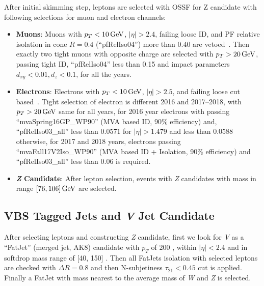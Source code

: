 After initial skimming step, leptons are selected with \gls{OSSF} for Z candidate
with following selections for muon and electron channels:
\begin{itemize}
  \item \textbf{Muons}: Muons with \( p_T < 10 \,\text{Ge\hspace{-.08em}V}{} \), \( |\eta| > 2.4 \),
        failing loose ID, and \gls{PF} relative isolation in cone \( R = 0.4 \) (``pfRelIso04'') more than
        \( 0.40 \) are vetoed~\cite{cms-muon-id}.
        Then exactly two tight muons with opposite charge are selected with \( p_T > 20 \,\text{Ge\hspace{-.08em}V}{} \), passing
        tight ID, ``pfRelIso04'' less than 0.15 and impact parameters \( d_{xy} < 0.01, d_z < 0.1 \),
        for all the years.
  \item \textbf{Electrons}: Electrons with \( p_T < 10 \,\text{Ge\hspace{-.08em}V}{} \), \( |\eta| > 2.5 \),
        and failing loose cut based~\cite{cms-egamma-id}.
        Tight selection of electron is different 2016 and 2017--2018,
        with \( p_T > 20 \,\text{Ge\hspace{-.08em}V} \) same for all years, for 2016 year electrons with
        passing ``mvaSpring16GP\_WP90'' (MVA based ID, 90\% efficiency) and, ``pfRelIso03\_all'' less than \( 0.0571 \) for
        \( |\eta| > 1.479 \) and less than \( 0.0588 \) otherwise,
        for 2017 and 2018 years, electrons passing ``mvaFall17V2Iso\_WP90'' (MVA based ID + Isolation, 90\% efficiency) and ``pfRelIso03\_all''
        less than \( 0.06 \) is required.
  \item \textbf{\textit{Z} Candidate}: After lepton selection, events with
        \textit{Z} candidates with mass in range \( [76, 106] \,\text{Ge\hspace{-.08em}V}{} \) are selected.
\end{itemize}

\subsection{
  VBS Tagged Jets and \textit{V} Jet Candidate
}
After selecting leptons and constructing \textit{Z} candidate, first we look
for \textit{V} as a ``FatJet'' (merged jet, AK8) candidate with \( p_T \) of 200 \GeV{},
within \( |\eta| < 2.4 \) and in softdrop mass range of [40, 150] \GeV{}.
Then all FatJets isolation with selected leptons are checked with \( \Delta R = 0.8 \)
and then N-subjetiness \( \tau_{21} < 0.45 \) cut is applied.
Finally a FatJet with mass nearest to the average mass of \textit{W} and \textit{Z}
is selected.


